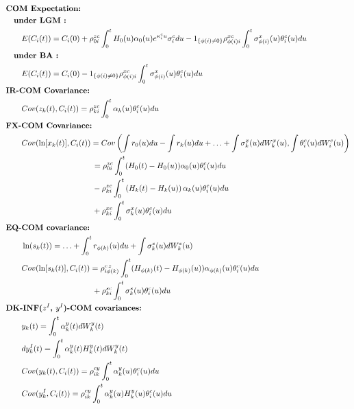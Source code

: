 \documentclass[]{article}
\begin{document}
\begin{align}
&\text{\textbf{COM Expectation:} }   \nonumber \\
%
&\quad\text{\textbf{under LGM :} } \nonumber \\
&\quad\quad E(C_i(t)) = C_i(0) + \rho^{zc}_{0i } \int_{0}^t   H_0(u) \alpha_0(u) e^{\kappa^c_i u}  \sigma_i^c du - 1_{\{ \phi(i) \neq 0\}} \rho^{xc}_{\phi(i)i}   \int_0^t  \sigma^x_{\phi(i)}(u) \theta^c_i(u) du\nonumber \\
%
&\quad\text{\textbf{under BA :} } \nonumber \\
&\quad\quad E(C_i(t)) = C_i(0) - 1_{\{ \phi(i) \neq 0\}} \rho^{xc}_{\phi(i)i}   \int_0^t  \sigma^x_{\phi(i)}(u) \theta^c_i(u) du\nonumber \\
%
&\text{\textbf{IR-COM Covariance:} } \nonumber \\
& \quad\quad  Cov (z_k(t),C_i(t) ) = \rho^{zc}_{ki } \int_{0}^t   \alpha_k(u) \theta^c_i(u) du \nonumber\\
%
&\text{\textbf{FX-COM Covariance:} }  \nonumber \\
&\quad\quad Cov(\ln[x_{k}(t)], C_i(t)) =Cov\left(\int r_0(u) du - \int r_k(u) du +\ldots+  \int \sigma^x_k(u)dW^x_k(u), \int \theta^c_i(u) dW^c_i(u) \right) \nonumber \\
&\quad\quad\quad\quad \quad\quad\quad\quad\quad\quad\quad  = \rho^{zc}_{0i}  \int_0^t  (H_0(t) - H_0(u)) \alpha_0(u)\theta^c_i(u) du \nonumber \\
&\quad\quad \quad\quad \quad\quad\quad\quad\quad\quad \quad- \rho^{zc}_{ki}  \int_0^t    \left(H_{k}(t) - H_{k}(u) \right)\alpha_{k}(u) \theta^c_i(u) du  \nonumber \\
&\quad\quad \quad\quad \quad\quad\quad\quad \quad\quad \quad+\rho^{xc}_{ki}   \int_0^t  \sigma^x_{k}(u)\theta^c_i(u) du\nonumber \\
%
&\text{\textbf{EQ-COM covariance:} } \nonumber \\
& \quad\quad \ln(s_k(t)) = \ldots + \int_0^t r_{\phi(k)}(u) du  + \int \sigma^s_k(u)dW^s_k(u)\nonumber \\
&\quad\quad Cov(\ln [ s_{k}(t) ], C_i(t)) %
 = \rho^{c\,z}_{i\phi(k)}  \int_0^t  (H_{\phi(k)}(t) - H_{\phi(k)}(u)) \alpha_{\phi(k)}(u) \theta^c_i(u) du \nonumber \\
&\quad\quad\quad\quad \quad\quad\quad\quad\quad\quad\quad  +\rho^{sc}_{ki}   \int_0^t  \sigma^s_{k}(u) \theta^c_i(u)du\nonumber \\
%
&\text{\textbf{DK-INF($z^I$, $y^I$)-COM covariances:} } \nonumber \\
& \quad\quad y_k(t) = \int_0^t \alpha^y_k(t) dW^{y}_k(t) \nonumber \\
& \quad\quad dy^I_k(t) = \int_0^t\alpha^y_k(t) H^y_k(t) dW^{y}_k(t) \nonumber \\
&\quad\quad Cov( y_k(t) , C_i(t)) = \rho^{cy}_{ik}   \int_0^t  \alpha^{y}_{k}(u) \theta^c_i(u) du\nonumber \\
&\quad\quad Cov(y^{I}_k , C_i(t)) = \rho^{cy}_{ik}   \int_0^t  \alpha^{y}_{k}(u) H^{y}_{k}(u)  \theta^c_i(u) du\nonumber 
%
\end{align}
\end{document}

